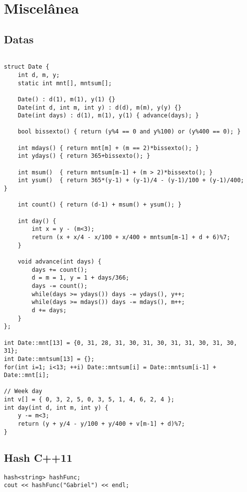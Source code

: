 \chapter{Miscelânea}

\section{Datas}

\begin{multicols}{2}
	\begin{lstlisting}

struct Date {
	int d, m, y;
	static int mnt[], mntsum[];
	
	Date() : d(1), m(1), y(1) {}
	Date(int d, int m, int y) : d(d), m(m), y(y) {}
	Date(int days) : d(1), m(1), y(1) { advance(days); }
	
	bool bissexto() { return (y%4 == 0 and y%100) or (y%400 == 0); }
		
	int mdays() { return mnt[m] + (m == 2)*bissexto(); }
	int ydays() { return 365+bissexto(); }
		
	int msum()  { return mntsum[m-1] + (m > 2)*bissexto(); }
	int ysum()  { return 365*(y-1) + (y-1)/4 - (y-1)/100 + (y-1)/400; }
		
	int count() { return (d-1) + msum() + ysum(); }
		
	int day() {
		int x = y - (m<3);
		return (x + x/4 - x/100 + x/400 + mntsum[m-1] + d + 6)%7;
	}
		
	void advance(int days) {
		days += count();
		d = m = 1, y = 1 + days/366;
		days -= count();
		while(days >= ydays()) days -= ydays(), y++;
		while(days >= mdays()) days -= mdays(), m++;
		d += days;
	}
};
	
int Date::mnt[13] = {0, 31, 28, 31, 30, 31, 30, 31, 31, 30, 31, 30, 31};
int Date::mntsum[13] = {};
for(int i=1; i<13; ++i) Date::mntsum[i] = Date::mntsum[i-1] + Date::mnt[i];

// Week day
int v[] = { 0, 3, 2, 5, 0, 3, 5, 1, 4, 6, 2, 4 };
int day(int d, int m, int y) {
	y -= m<3;
	return (y + y/4 - y/100 + y/400 + v[m-1] + d)%7;
}
\end{lstlisting}
\end{multicols}

\section{Hash C++11}
\begin{lstlisting}
hash<string> hashFunc;
cout << hashFunc("Gabriel") << endl;
\end{lstlisting}

